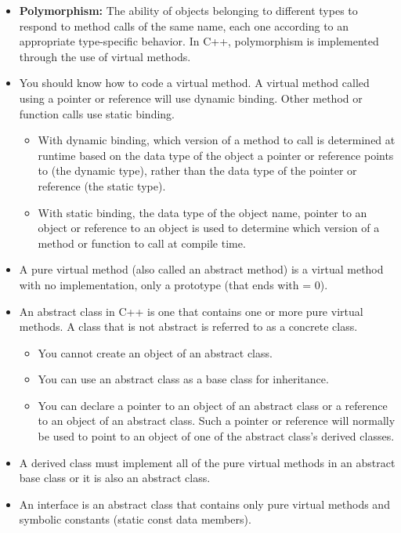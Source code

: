 \documentclass{report}
\begin{document}
    \pagebreak 
    \bigbreak \noindent 
    \begin{itemize}
        \item \textbf{Polymorphism:} The ability of objects belonging to different types to respond to method calls of the same name, each one according to an appropriate type-specific behavior. In C++, polymorphism is implemented through the use of virtual methods.
        \item You should know how to code a virtual method. A virtual method called using a pointer or reference will use dynamic binding. Other method or function calls use static binding.
        \begin{itemize}
            \item With dynamic binding, which version of a method to call is determined at runtime based on the data type of the object a pointer or reference points to (the dynamic type), rather than the data type of the pointer or reference (the static type).
            \item With static binding, the data type of the object name, pointer to an object or reference to an object is used to determine which version of a method or function to call at compile time.
        \end{itemize}
        \item A pure virtual method (also called an abstract method) is a virtual method with no implementation, only a prototype (that ends with = 0).
        \item An abstract class in C++ is one that contains one or more pure virtual methods. A class that is not abstract is referred to as a concrete class.
        \begin{itemize}
            \item You cannot create an object of an abstract class.
            \item You can use an abstract class as a base class for inheritance.
            \item You can declare a pointer to an object of an abstract class or a reference to an object of an abstract class. Such a pointer or reference will normally be used to point to an object of one of the abstract class’s derived classes.
        \end{itemize}
        \item A derived class must implement all of the pure virtual methods in an abstract base class or it is also an abstract class.
        \item An interface is an abstract class that contains only pure virtual methods and symbolic constants (static const data members).
    \end{itemize}













    
\end{document}

